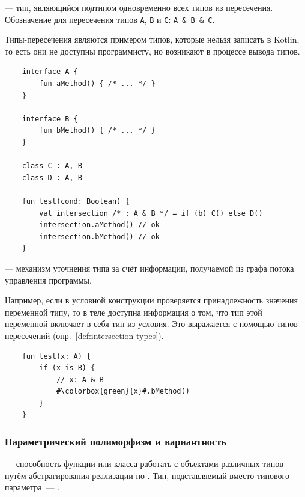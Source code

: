 \begin{definition}
    \label{def:intersection-types}
     --- тип, являющийся подтипом одновременно всех типов из пересечения.
    Обозначение для пересечения типов \texttt{A}, \texttt{B} и \texttt{C}: \texttt{A \& B \& C}.
\end{definition}

Типы-пересечения являются примером типов, которые нельзя записать в Kotlin, то есть они не доступны программисту, но возникают в процессе вывода типов.
\begin{verbatim}
    interface A {
        fun aMethod() { /* ... */ }
    }

    interface B {
        fun bMethod() { /* ... */ }
    }

    class C : A, B
    class D : A, B

    fun test(cond: Boolean) {
        val intersection /* : A & B */ = if (b) C() else D()
        intersection.aMethod() // ok
        intersection.bMethod() // ok
    }
\end{verbatim}

\begin{definition}
     --- механизм уточнения типа за счёт информации, получаемой из графа потока управления программы.
\end{definition}

Например, если в условной конструкции проверяется принадлежность значения переменной типу, то в теле доступна информация о том, что тип этой переменной включает в себя тип из условия.
Это выражается с помощью типов-пересечений (опр.~\ref{def:intersection-types}).

\begin{verbatim}
    fun test(x: A) {
        if (x is B) {
            // x: A & B
            #\colorbox{green}{x}#.bMethod()
        }
    }
\end{verbatim}

\subsubsection{Параметрический полиморфизм и вариантность}\label{subsubsec:variance}

\begin{definition}
    \label{def:param-poly}
     --- способность функции или класса работать с объектами различных типов путём абстрагирования реализации по .
    Тип, подставляемый вместо типового параметра~--- .
\end{definition}

